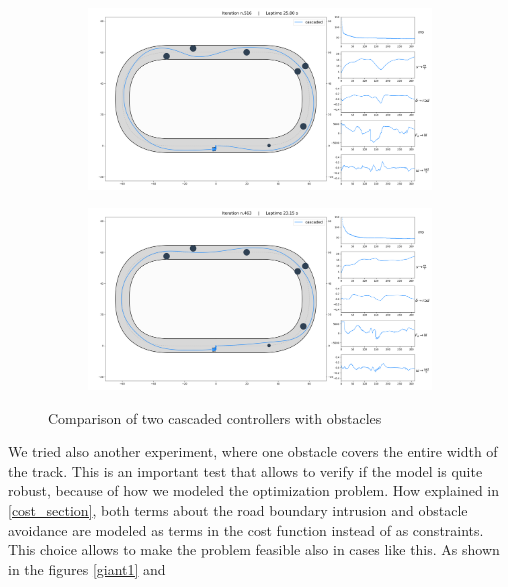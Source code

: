 \documentclass[a4paper, onecolumn, 12pt]{article}
\begin{document}
\begin{figure}[H]
    \centering
    \begin{subfigure}{0.9\textwidth}
        \centering
        \includegraphics[width=\textwidth]{assets/obstacles1_ippodromo.png}
        \label{obs1}
    \end{subfigure}
    \begin{subfigure}{0.9\textwidth}
        \centering
        \includegraphics[width=\textwidth]{assets/obstacle2_ippodromo.png}
    \end{subfigure}
    \caption[short]{Comparison of two cascaded controllers with obstacles}
\end{figure}
We tried also another experiment, where one obstacle covers the entire width of the 
track. This is an important test that allows to verify if the model is quite robust,
because of how we modeled the optimization problem. How explained in \ref{cost_section},
both terms about the road boundary intrusion and obstacle avoidance are modeled
as terms in the cost function instead of as constraints. This choice allows to make the
problem feasible also in cases like this. As shown in the figures \ref{giant1} and 
\end{document}
